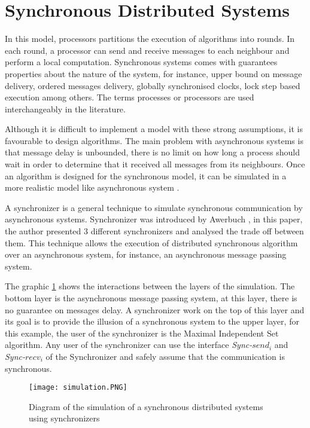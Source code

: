 \section{Synchronous Distributed Systems}
\label{chap:3}

In this model, processors partitions the execution of algorithms into rounds. In each round, a processor can send and receive messages to each neighbour and perform a local computation. Synchronous systems comes with guarantees properties about the nature of the system, for instance, upper bound on message delivery, ordered messages delivery, globally synchronised clocks, lock step based execution among others. The terms processes or processors are used interchangeably in the literature. 

Although it is difficult to implement a model with these strong assumptions, it is favourable to design algorithms. The main problem with asynchronous systems is that message delay is unbounded, there is no limit on how long a process should wait in order to determine that it received all messages from its neighbours. Once an algorithm is designed for the synchronous model, it can be simulated in a more realistic model like asynchronous system \cite{attiya2004distributed}.

A synchronizer is a general technique to simulate synchronous communication by asynchronous systems. Synchronizer was introduced by Awerbuch \cite{awerbuch1985complexity}, in this paper, the author presented 3 different synchronizers and analysed the trade off between them. This technique allows the execution of distributed synchronous algorithm over an asynchronous system, for instance, an asynchronous message passing system.  

The graphic \ref{fig:simulation} shows the interactions between the layers of the simulation. The bottom layer is the asynchronous message passing system, at this layer, there is no guarantee on messages delay. A synchronizer work on the top of this layer and its goal is to provide the illusion of a synchronous system to the upper layer, for this example, the user of the synchronizer is the Maximal Independent Set algorithm. Any user of the synchronizer can use the interface \textit{Sync-}$send_i$ and \textit{Sync-}$recv_i$ of the Synchronizer and safely assume that the communication is synchronous.     

\begin{figure}[ht]
\centering
\texttt{[image: simulation.PNG]} 
\caption{Diagram of the simulation of a synchronous distributed systems using synchronizers}
\label{fig:simulation}
\end{figure}



